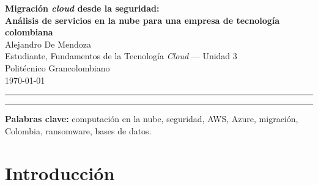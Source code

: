 \documentclass[12pt, a4paper]{article}
\begin{document}

\begin{center}
  {\Large \textbf{Migración \textit{cloud} desde la seguridad:}}\\[4pt]
  {\large \textbf{Análisis de servicios en la nube para una empresa de tecnología colombiana}}\\[18pt]
  {\normalsize Alejandro De Mendoza}\\[4pt]
  {\small Estudiante, Fundamentos de la Tecnología \textit{Cloud} — Unidad 3}\\
  {\small Politécnico Grancolombiano}\\[4pt]
  {\small \today}
\end{center}

\hrule
\vspace{6pt}

\begin{abstract}
\noindent
El presente artículo analiza la estrategia de migración hacia servicios en la nube de \textbf{TechSoluciones S.A.S.}, empresa colombiana de desarrollo de software ubicada en Bogotá. Se identifican las tecnologías actuales de la organización, se proponen tres servicios cloud concretos con énfasis en seguridad y disponibilidad, y se realiza un comparativo con proveedores alternativos. El análisis concluye que una arquitectura híbrida basada en \textit{Amazon Web Services} (AWS), con capas de seguridad perimetral e identidad, representa la opción más sólida para empresas medianas del sector TIC en Colombia, sin descartar ventajas puntuales de Microsoft Azure y Google Cloud Platform.
\end{abstract}

\vspace{6pt}
\hrule
\vspace{10pt}

\textbf{Palabras clave:} computación en la nube, seguridad, AWS, Azure, migración, Colombia, ransomware, bases de datos.

\vspace{14pt}

\section{Introducción}
\end{document}
